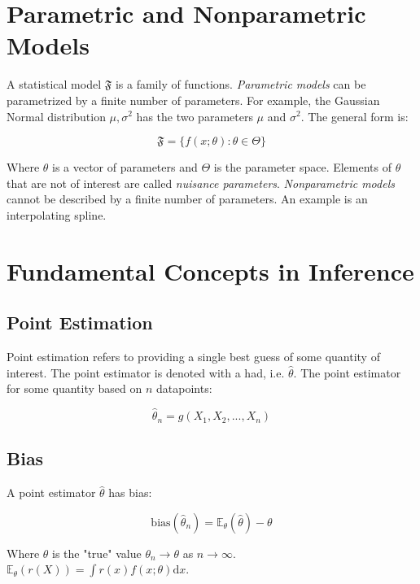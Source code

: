 \section{Parametric and Nonparametric Models}

A statistical model $\mathfrak{F}$ is a family of functions. \textit{Parametric models} can be parametrized by a finite number of parameters. For example, the Gaussian Normal distribution $\mathscr{\mu,\sigma^2}$ has the two parameters $\mu$ and $\sigma^2$. The general form is:

\begin{equation}
\mathfrak{F} = \{f(x;\theta): \theta \in \Theta \}
\end{equation}

Where $\theta$ is a vector of parameters and $\Theta$ is the parameter space. Elements of $\theta$ that are not of interest are called \textit{nuisance parameters}. \textit{Nonparametric models} cannot be described by a finite number of parameters. An example is an interpolating spline.


\section{Fundamental Concepts in Inference}


\subsection{Point Estimation}
Point estimation refers to providing a single best guess of some quantity of interest. The point estimator is denoted with a had, i.e. $\hat{\theta}$. The point estimator for some quantity based on $n$ datapoints:

\begin{equation}
\hat{\theta}_n = g(X_1,X_2,...,X_n)
\end{equation}


\subsection{Bias}
A point estimator $\hat{\theta}$ has bias:

\begin{equation}
\mathrm{bias}(\hat{\theta}_n) = \mathbb{E}_\theta (\hat{\theta}) - \theta
\end{equation}

Where $\theta$ is the "true" value $\theta_n \rightarrow \theta$ as $n \rightarrow \infty$. $\mathbb{E}_{\theta}(r(X)) = \int r(x) f(x;\theta) \mathrm{d}x$. 


